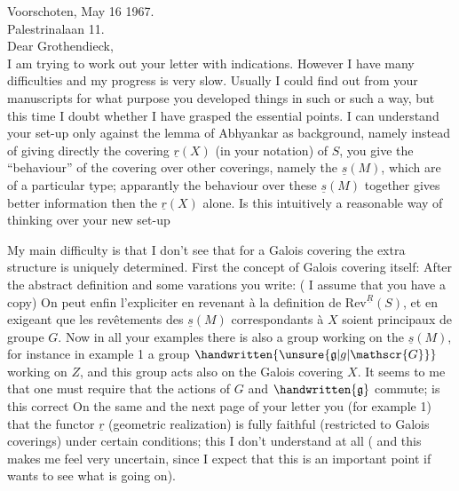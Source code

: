 Voorschoten, May 16 1967.\\
Palestrinalaan 11.\\

Dear Grothendieck,\\

I am trying to work out your letter with indications. However I have many difficulties and my progress is very slow. Usually I could find out from your manuscripts for what purpose you developed things in such or such a way, but this time I doubt whether I have grasped the essential points. I can understand your set-up only against the lemma of Abhyankar as background, namely instead of giving directly the covering $\underline{r}(X)$ (in your notation) of $S$, you give the ``behaviour'' of the covering over other coverings, namely the $\underline{s}(M)$, which are of a particular type; apparantly the behaviour over  these $\underline{s}(M)$ together gives better information then the $\underline{r}(X)$ alone. Is this intuitively a reasonable way of thinking over your new set-up

My main difficulty is that I don't see that for a Galois covering the extra structure is uniquely determined. First the concept of Galois covering itself: After the abstract definition and some varations you write: ( I assume that you have a copy) On peut enfin l'expliciter en revenant à la definition de $\mathrm{Rev}^{\underline{R}}(S)$, et en exigeant que les revêtements des $\underline{s}(M)$ correspondants à $X$ soient principaux de groupe $G$. Now in all your examples there is also a group working on the $\underline{s}(M)$, for instance in example 1 a group $\handwritten{\unsure{\mathfrak{g}|g|\mathscr{G}}}$ working on $Z$, and this group acts also on the Galois covering  $X$. It seems to me that one must require that the actions of $G$ and $\handwritten{\mathfrak{g}}$ commute; is this correct On the same and the next page of your letter you  (for example 1) that the functor $\underline{r}$ (geometric realization) is fully faithful (restricted to Galois coverings) under certain conditions; this I don't understand at all ( and  this makes me feel very uncertain, since I expect that this is an important point  if  wants to see what is going on\handwritten{!}).

